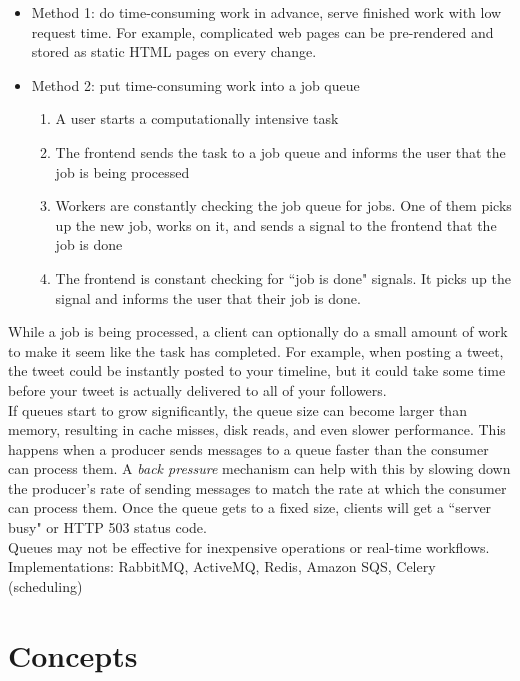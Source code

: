 \documentclass[12pt, titlepage]{article}
\begin{document}
\begin{itemize}
  \item Method 1: do time-consuming work in advance, serve finished work with low request time. For example, complicated web pages can be pre-rendered and stored as static HTML pages on every change.
  \item Method 2: put time-consuming work into a job queue
    \begin{enumerate}
      \item A user starts a computationally intensive task
      \item The frontend sends the task to a job queue and informs the user that the job is being processed
      \item Workers are constantly checking the job queue for jobs. One of them picks up the new job, works on it, and sends a signal to the frontend that the job is done
      \item The frontend is constant checking for ``job is done" signals. It picks up the signal and informs the user that their job is done.
    \end{enumerate}
\end{itemize}

While a job is being processed, a client can optionally do a small amount of work to make it seem like the task has completed. For example, when posting a tweet, the tweet could be instantly posted to your timeline, but it could take some time before your tweet is actually delivered to all of your followers. \\

If queues start to grow significantly, the queue size can become larger than memory, resulting in cache misses, disk reads, and even slower performance. This happens when a producer sends messages to a queue faster than the consumer can process them. A \textit{back pressure} mechanism can help with this by slowing down the producer's rate of sending messages to match the rate at which the consumer can process them. Once the queue gets to a fixed size, clients will get a ``server busy" or HTTP 503 status code. \\

Queues may not be effective for inexpensive operations or real-time workflows. \\

Implementations: RabbitMQ, ActiveMQ, Redis, Amazon SQS, Celery (scheduling)

\section{Concepts}
\end{document}
